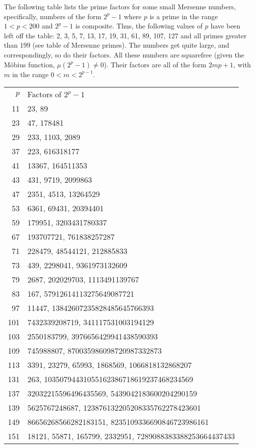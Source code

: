 \documentclass[12pt]{article}
\begin{document}
The following table lists the prime factors for some small Mersenne numbers, specifically, numbers of the form $2^p - 1$ where $p$ is a prime in the range $1 < p < 200$ and $2^p - 1$ is composite. Thus, the following values of $p$ have been left off the table: 2, 3, 5, 7, 13, 17, 19, 31, 61, 89, 107, 127 and all primes greater than 199 (see table of Mersenne primes). The numbers get quite large, and correspondingly, so do their factors. All these numbers are squarefree (given the M\"obius function, $\mu(2^p - 1) \neq 0$). Their factors are all of the form $2mp + 1$, with $m$ in the range $0 < m < 2^{p - 1}$.

\begin{tabular}{|r|l|}
$p$ & Factors of $2^p - 1$ \\
11 & 23, 89 \\ 
23 & 47, 178481 \\ 
29 & 233, 1103, 2089 \\ 
37 & 223, 616318177 \\ 
41 & 13367, 164511353 \\ 
43 & 431, 9719, 2099863 \\ 
47 & 2351, 4513, 13264529 \\ 
53 & 6361, 69431, 20394401 \\ 
59 & 179951, 3203431780337 \\ 
67 & 193707721, 761838257287 \\ 
71 & 228479, 48544121, 212885833 \\ 
73 & 439, 2298041, 9361973132609 \\ 
79 & 2687, 202029703, 1113491139767 \\ 
83 & 167, 57912614113275649087721 \\
97 & 11447, 13842607235828485645766393 \\
101 & 7432339208719, 341117531003194129 \\ 
103 & 2550183799, 3976656429941438590393 \\ 
109 & 745988807, 870035986098720987332873 \\ 
113 & 3391, 23279, 65993, 1868569, 1066818132868207 \\ 
131 & 263, 10350794431055162386718619237468234569 \\ 
137 & 32032215596496435569, 5439042183600204290159 \\ 
139 & 5625767248687, 123876132205208335762278423601 \\ 
149 & 86656268566282183151, 8235109336690846723986161 \\ 
151 & 18121, 55871, 165799, 2332951, 7289088383388253664437433 \\ 

\end{tabular}
\end{document}
